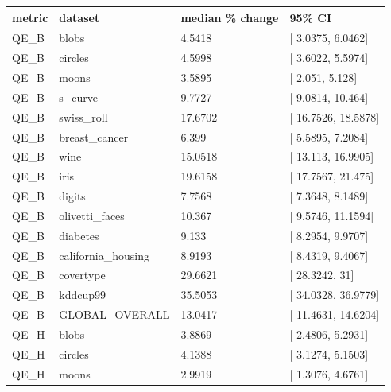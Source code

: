 \documentclass[
]{article}
\newcounter{none} %
\providecommand{\DIFadd}[1]{{\protect\color{blue} #1}} %
\providecommand{\DIFaddbegin}{} %
\begin{document}
\DIFaddbegin {\def\LTcaptype{none} %
\begin{longtable}[]{@{}llll@{}}
\toprule\noalign{}
\DIFadd{metric }& \DIFadd{dataset }& \DIFadd{median \% change }& \DIFadd{95\% CI }\\
\midrule\noalign{}
\endhead
\bottomrule\noalign{}
\endlastfoot
\DIFadd{QE\_B }& \DIFadd{blobs }& \DIFadd{4.5418 }& {[}\DIFadd{3.0375, 6.0462}{]} \\
\DIFadd{QE\_B }& \DIFadd{circles }& \DIFadd{4.5998 }& {[}\DIFadd{3.6022, 5.5974}{]} \\
\DIFadd{QE\_B }& \DIFadd{moons }& \DIFadd{3.5895 }& {[}\DIFadd{2.051, 5.128}{]} \\
\DIFadd{QE\_B }& \DIFadd{s\_curve }& \DIFadd{9.7727 }& {[}\DIFadd{9.0814, 10.464}{]} \\
\DIFadd{QE\_B }& \DIFadd{swiss\_roll }& \DIFadd{17.6702 }& {[}\DIFadd{16.7526, 18.5878}{]} \\
\DIFadd{QE\_B }& \DIFadd{breast\_cancer }& \DIFadd{6.399 }& {[}\DIFadd{5.5895, 7.2084}{]} \\
\DIFadd{QE\_B }& \DIFadd{wine }& \DIFadd{15.0518 }& {[}\DIFadd{13.113, 16.9905}{]} \\
\DIFadd{QE\_B }& \DIFadd{iris }& \DIFadd{19.6158 }& {[}\DIFadd{17.7567, 21.475}{]} \\
\DIFadd{QE\_B }& \DIFadd{digits }& \DIFadd{7.7568 }& {[}\DIFadd{7.3648, 8.1489}{]} \\
\DIFadd{QE\_B }& \DIFadd{olivetti\_faces }& \DIFadd{10.367 }& {[}\DIFadd{9.5746, 11.1594}{]} \\
\DIFadd{QE\_B }& \DIFadd{diabetes }& \DIFadd{9.133 }& {[}\DIFadd{8.2954, 9.9707}{]} \\
\DIFadd{QE\_B }& \DIFadd{california\_housing }& \DIFadd{8.9193 }& {[}\DIFadd{8.4319, 9.4067}{]} \\
\DIFadd{QE\_B }& \DIFadd{covertype }& \DIFadd{29.6621 }& {[}\DIFadd{28.3242, 31}{]} \\
\DIFadd{QE\_B }& \DIFadd{kddcup99 }& \DIFadd{35.5053 }& {[}\DIFadd{34.0328, 36.9779}{]} \\
\DIFadd{QE\_B }& \DIFadd{GLOBAL\_OVERALL }& \DIFadd{13.0417 }& {[}\DIFadd{11.4631, 14.6204}{]} \\
\DIFadd{QE\_H }& \DIFadd{blobs }& \DIFadd{3.8869 }& {[}\DIFadd{2.4806, 5.2931}{]} \\
\DIFadd{QE\_H }& \DIFadd{circles }& \DIFadd{4.1388 }& {[}\DIFadd{3.1274, 5.1503}{]} \\
\DIFadd{QE\_H }& \DIFadd{moons }& \DIFadd{2.9919 }& {[}\DIFadd{1.3076, 4.6761}{]} \\

\end{longtable}}
\end{document}
